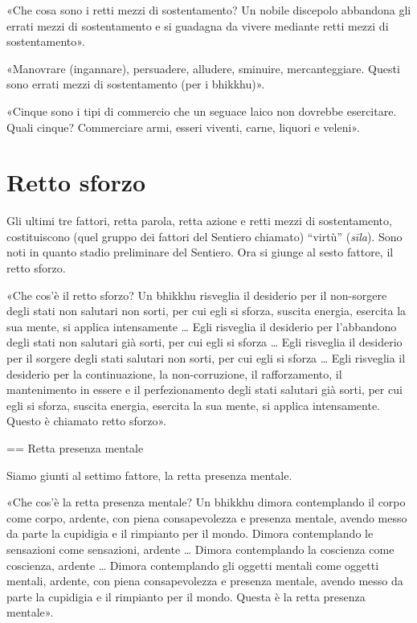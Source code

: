 «Che cosa sono i retti mezzi di sostentamento? Un nobile
discepolo abbandona gli errati mezzi di sostentamento e si guadagna da
vivere mediante retti mezzi di sostentamento».




«Manovrare (ingannare), persuadere, alludere, sminuire, mercanteggiare.
Questi sono errati mezzi di sostentamento (per i bhikkhu)».




«Cinque sono i tipi di commercio che un seguace laico non dovrebbe
esercitare. Quali cinque? Commerciare armi, esseri viventi, carne,
liquori e veleni».




\hypertarget{x-retto-sforzo}{\section*{Retto sforzo}}
 Gli ultimi tre fattori, retta parola, retta azione e
retti mezzi di sostentamento, costituiscono (quel gruppo dei fattori del
Sentiero chiamato) “virtù” (\emph{sīla}). Sono noti in quanto stadio
preliminare del Sentiero. Ora si giunge al sesto fattore, il retto
sforzo.


 «Che cos’è il retto sforzo? Un bhikkhu risveglia il
desiderio per il non-sorgere degli stati non salutari non sorti, per cui
egli si sforza, suscita energia, esercita la sua mente, si applica
intensamente … Egli risveglia il desiderio per l’abbandono degli stati
non salutari già sorti, per cui egli si sforza … Egli risveglia il
desiderio per il sorgere degli stati salutari non sorti, per cui egli si
sforza … Egli risveglia il desiderio per la continuazione, la
non-corruzione, il rafforzamento, il mantenimento in essere e il
perfezionamento degli stati salutari già sorti, per cui egli si sforza,
suscita energia, esercita la sua mente, si applica intensamente. Questo
è chiamato retto sforzo».




\label{pag267}
== Retta presenza mentale


 Siamo giunti al settimo fattore, la retta presenza
mentale.


 «Che cos’è la retta presenza mentale? Un bhikkhu dimora
contemplando il corpo come corpo, ardente, con piena consapevolezza e
presenza mentale, avendo messo da parte la cupidigia e il rimpianto per
il mondo. Dimora contemplando le sensazioni come sensazioni, ardente …
Dimora contemplando la coscienza come coscienza, ardente … Dimora
contemplando gli oggetti mentali come oggetti mentali, ardente, con
piena consapevolezza e presenza mentale, avendo messo da parte la
cupidigia e il rimpianto per il mondo. Questa è la retta presenza
mentale».


